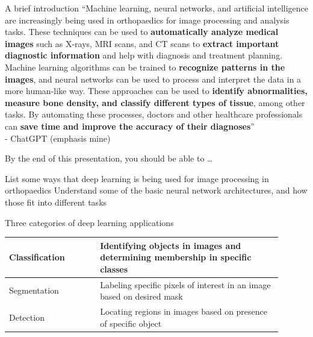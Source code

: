 \begin{frame}{A brief introduction}
   ``Machine learning, neural networks, and artificial intelligence are increasingly being used in orthopaedics for image processing and analysis tasks. These techniques can be used to {\bf automatically analyze medical images} such as X-rays, MRI scans, and CT scans to {\bf extract important diagnostic information} and help with diagnosis and treatment planning. Machine learning algorithms can be trained to {\bf recognize patterns in the images}, and neural networks can be used to process and interpret the data in a more human-like way. These approaches can be used to {\bf identify abnormalities, measure bone density, and classify different types of tissue}, among other tasks. By automating these processes, doctors and other healthcare professionals can {\bf save time and improve the accuracy of their diagnoses}'' \\
\vspace{5mm}
   \hfill - ChatGPT (emphasis mine)
\end{frame}

\begin{frame}{By the end of this presentation, you should be able to \dots}
   \begin{baseitemize}
      \itemR List some ways that deep learning is being used for image processing in orthopaedics
      \itemR Understand some of the basic neural network architectures, and how those fit into different tasks
   \end{baseitemize}
\end{frame}

\begin{frame}{Three categories of deep learning applications}
   \begin{center}
            \begin{tabular}{p{0.3\linewidth}|p{0.6\linewidth}}
               Classification & Identifying objects in images and determining membership in specific classes \pause \\ \hline
               Segmentation & Labeling specific pixels of interest in an image based on desired mask \pause \\ \hline
               Detection & Locating regions in images based on presence of specific object
            \end{tabular}
      \end{center}
\end{frame}



